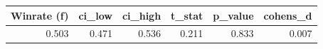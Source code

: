 \begin{tabular}{rrrrrr}
\toprule
Winrate (f) & ci\_low & ci\_high & t\_stat & p\_value & cohens\_d \\
\midrule
0.503 & 0.471 & 0.536 & 0.211 & 0.833 & 0.007 \\
\bottomrule
\end{tabular}
